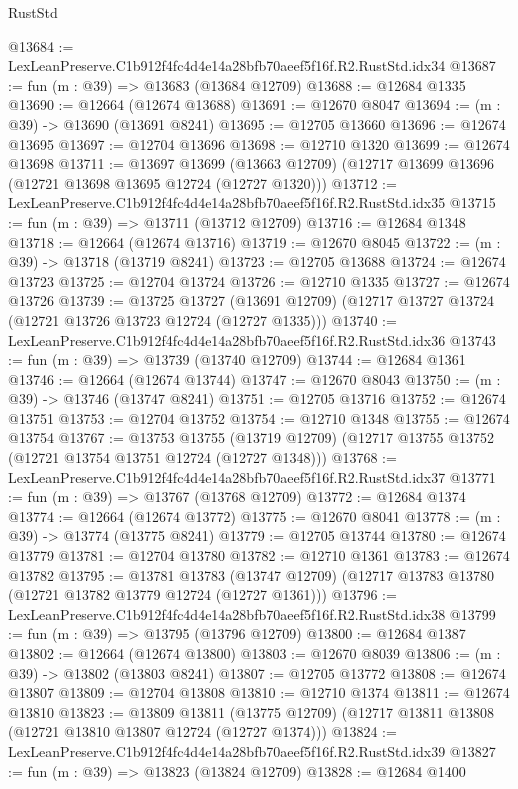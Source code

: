 \begin{lexlean}{RustStd}
\begin{coremodule}
@13684 := LexLeanPreserve.C1b912f4fc4d4e14a28bfb70aeef5f16f.R2.RustStd.idx34
@13687 := fun (m : @39) => @13683 (@13684 @12709)
@13688 := @12684 @1335
@13690 := @12664 (@12674 @13688)
@13691 := @12670 @8047
@13694 := (m : @39) -> @13690 (@13691 @8241)
@13695 := @12705 @13660
@13696 := @12674 @13695
@13697 := @12704 @13696
@13698 := @12710 @1320
@13699 := @12674 @13698
@13711 := @13697
    @13699
    (@13663 @12709)
    (@12717 @13699 @13696 (@12721 @13698 @13695 @12724 (@12727 @1320)))
@13712 := LexLeanPreserve.C1b912f4fc4d4e14a28bfb70aeef5f16f.R2.RustStd.idx35
@13715 := fun (m : @39) => @13711 (@13712 @12709)
@13716 := @12684 @1348
@13718 := @12664 (@12674 @13716)
@13719 := @12670 @8045
@13722 := (m : @39) -> @13718 (@13719 @8241)
@13723 := @12705 @13688
@13724 := @12674 @13723
@13725 := @12704 @13724
@13726 := @12710 @1335
@13727 := @12674 @13726
@13739 := @13725
    @13727
    (@13691 @12709)
    (@12717 @13727 @13724 (@12721 @13726 @13723 @12724 (@12727 @1335)))
@13740 := LexLeanPreserve.C1b912f4fc4d4e14a28bfb70aeef5f16f.R2.RustStd.idx36
@13743 := fun (m : @39) => @13739 (@13740 @12709)
@13744 := @12684 @1361
@13746 := @12664 (@12674 @13744)
@13747 := @12670 @8043
@13750 := (m : @39) -> @13746 (@13747 @8241)
@13751 := @12705 @13716
@13752 := @12674 @13751
@13753 := @12704 @13752
@13754 := @12710 @1348
@13755 := @12674 @13754
@13767 := @13753
    @13755
    (@13719 @12709)
    (@12717 @13755 @13752 (@12721 @13754 @13751 @12724 (@12727 @1348)))
@13768 := LexLeanPreserve.C1b912f4fc4d4e14a28bfb70aeef5f16f.R2.RustStd.idx37
@13771 := fun (m : @39) => @13767 (@13768 @12709)
@13772 := @12684 @1374
@13774 := @12664 (@12674 @13772)
@13775 := @12670 @8041
@13778 := (m : @39) -> @13774 (@13775 @8241)
@13779 := @12705 @13744
@13780 := @12674 @13779
@13781 := @12704 @13780
@13782 := @12710 @1361
@13783 := @12674 @13782
@13795 := @13781
    @13783
    (@13747 @12709)
    (@12717 @13783 @13780 (@12721 @13782 @13779 @12724 (@12727 @1361)))
@13796 := LexLeanPreserve.C1b912f4fc4d4e14a28bfb70aeef5f16f.R2.RustStd.idx38
@13799 := fun (m : @39) => @13795 (@13796 @12709)
@13800 := @12684 @1387
@13802 := @12664 (@12674 @13800)
@13803 := @12670 @8039
@13806 := (m : @39) -> @13802 (@13803 @8241)
@13807 := @12705 @13772
@13808 := @12674 @13807
@13809 := @12704 @13808
@13810 := @12710 @1374
@13811 := @12674 @13810
@13823 := @13809
    @13811
    (@13775 @12709)
    (@12717 @13811 @13808 (@12721 @13810 @13807 @12724 (@12727 @1374)))
@13824 := LexLeanPreserve.C1b912f4fc4d4e14a28bfb70aeef5f16f.R2.RustStd.idx39
@13827 := fun (m : @39) => @13823 (@13824 @12709)
@13828 := @12684 @1400

\end{coremodule}
\end{lexlean}
